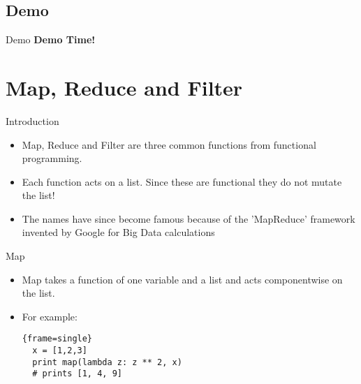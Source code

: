 \documentclass{beamer}
\begin{document}
\subsection{Demo}
\begin{frame}[fragile]{Demo}
	 \huge{\textbf{Demo Time!}}
\end{frame}



\section{Map, Reduce and Filter}
\begin{frame}[fragile]{Introduction}
	\begin{itemize}
	\item {Map, Reduce and Filter are three common functions from functional programming.
	} 
	\item{Each function acts on a list. Since these are functional they do not mutate the list!
}
\pause
\item{The names have since become famous because of the 'MapReduce' framework invented by Google for Big Data calculations
}
	\end{itemize}
\end{frame}
\begin{frame}[fragile]{Map}
	\begin{itemize}
	\item {Map takes a function of one variable and a list and acts componentwise on the list.
	} 
	\pause
	\item{For example:
  \begin{block}{}
  \begin{lstlisting}{frame=single}
  x = [1,2,3]
  print map(lambda z: z ** 2, x) 
  # prints [1, 4, 9]
  \end{lstlisting}
\end{block}
}
	\end{itemize}
\end{frame}
\end{document}
